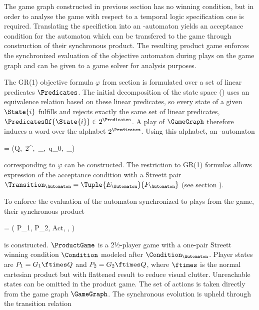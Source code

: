 The game graph constructed in previous section has no winning condition, but in order to analyse the game with respect to a temporal logic specification one is required.
Translating the specifiction into an \omega-automaton yields an acceptance condition for the automaton which can be transfered to the game through construction of their synchronous product.
The resulting product game enforces the synchronized evaluation of the objective automaton during plays on the game graph and can be given to a game solver for analysis purposes.


\startsubsection[title={Objective Automaton}]

    The GR(1) objective formula $\varphi$ from section  is formulated over a set of linear predicates $\Predicates$.
    The initial decomposition of the state space () uses an equivalence relation based on these linear predicates, so every state of a given $\State{i}$ fulfills and rejects exactly the same set of linear predicates, $\PredicatesOf{\State{i}} \in 2^\Predicates$.
    A play of $\GameGraph$ therefore induces a word over the alphabet $2^\Predicates$.
    Using this alphabet, an \omega-automaton

    \startformula
        \Automaton = (Q,\, 2^\Predicates,\, \Transition_\Automaton,\, q_0,\, \Condition_\Automaton)
    \stopformula

    corresponding to $\varphi$ can be constructed.
    The restriction to GR(1) formulas allows expression of the acceptance condition with a Streett pair $\Transition_\Automaton = \Tuple{E_\Automaton}{F_\Automaton}$ (see section ).

\stopsubsection


\startsubsection[title={Synchronized Product}]

    To enforce the evaluation of the automaton synchronized to plays from the game, their synchronous product

    \startformula
        \ProductGame = ( P_1, P_2, Act, \Transition, \Condition )
    \stopformula

    is constructed.
    $\ProductGame$ is a 2½-player game with a one-pair Streett winning condition $\Condition$ modeled after $\Condition_\Automaton$.
    Player states are $P_1 = G_1 \ftimes Q$ and $P_2 = G_2 \ftimes Q$, where $\ftimes$ is the normal cartesian product but with flattened result to reduce visual clutter.
    Unreachable states can be omitted in the product game.
    The set of actions is taken directly from the game graph $\GameGraph$.
    The synchronous evolution is upheld through the transition relation

